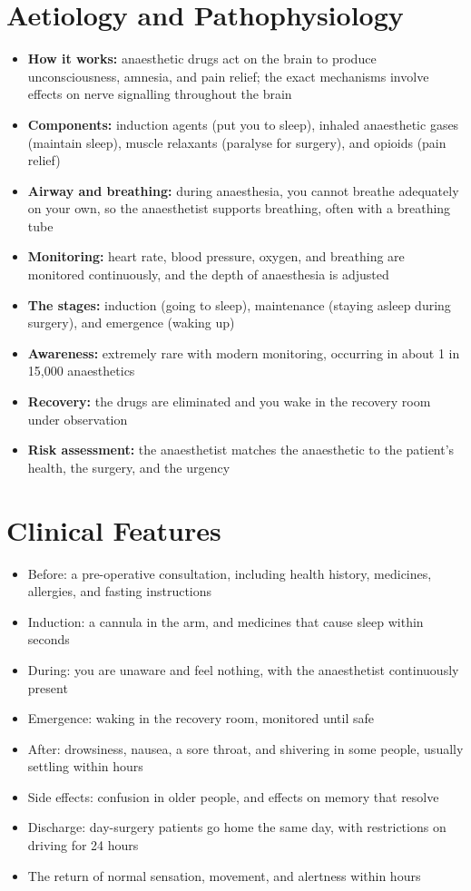 \section*{Aetiology and Pathophysiology}
\begin{itemize}
    \item \textbf{How it works:} anaesthetic drugs act on the brain to produce unconsciousness, amnesia, and pain relief; the exact mechanisms involve effects on nerve signalling throughout the brain
    \item \textbf{Components:} induction agents (put you to sleep), inhaled anaesthetic gases (maintain sleep), muscle relaxants (paralyse for surgery), and opioids (pain relief)
    \item \textbf{Airway and breathing:} during anaesthesia, you cannot breathe adequately on your own, so the anaesthetist supports breathing, often with a breathing tube
    \item \textbf{Monitoring:} heart rate, blood pressure, oxygen, and breathing are monitored continuously, and the depth of anaesthesia is adjusted
    \item \textbf{The stages:} induction (going to sleep), maintenance (staying asleep during surgery), and emergence (waking up)
    \item \textbf{Awareness:} extremely rare with modern monitoring, occurring in about 1 in 15,000 anaesthetics
    \item \textbf{Recovery:} the drugs are eliminated and you wake in the recovery room under observation
    \item \textbf{Risk assessment:} the anaesthetist matches the anaesthetic to the patient's health, the surgery, and the urgency
\end{itemize}

\section*{Clinical Features}
\begin{itemize}
    \item Before: a pre-operative consultation, including health history, medicines, allergies, and fasting instructions
    \item Induction: a cannula in the arm, and medicines that cause sleep within seconds
    \item During: you are unaware and feel nothing, with the anaesthetist continuously present
    \item Emergence: waking in the recovery room, monitored until safe
    \item After: drowsiness, nausea, a sore throat, and shivering in some people, usually settling within hours
    \item Side effects: confusion in older people, and effects on memory that resolve
    \item Discharge: day-surgery patients go home the same day, with restrictions on driving for 24 hours
    \item The return of normal sensation, movement, and alertness within hours
\end{itemize}


